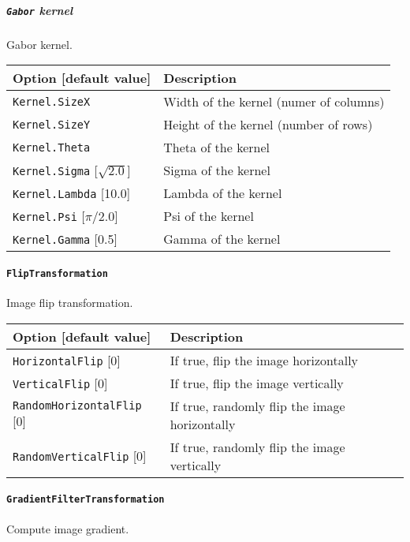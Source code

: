 \documentclass[a4paper,11pt,oneside]{article}
\newcommand{\iponly}{\reversemarginpar
    \marginnote{\color{listletiblue}\normalfont\scriptsize
    {\ttfamily{}\hyperref[sec:N2D2-IP]{\color{listletiblue}N2D2 IP}} \emph{only}}}
\begin{document}
\subparagraph{\texorpdfstring{%
\lstinline[basicstyle=\ttfamily\bfseries]!Gabor! kernel}{Gabor kernel}}
Gabor kernel.

\begin{center}
 \begin{tabular}{| m{4cm} | m{7cm} | }
 \hline
 Option [default value] & Description\\
 \hline\hline
  \cellcolor{requiredcolor}\lstinline!Kernel.SizeX! & Width of the kernel
  (numer of columns)\\
  \cellcolor{requiredcolor}\lstinline!Kernel.SizeY! & Height of the kernel
  (number of rows)\\
  \cellcolor{requiredcolor}\lstinline!Kernel.Theta! & Theta of the kernel\\
  \lstinline!Kernel.Sigma! [$\sqrt{2.0}$] & Sigma of the kernel\\
  \lstinline!Kernel.Lambda! [10.0] & Lambda of the kernel\\
  \lstinline!Kernel.Psi! [$\pi/2.0$] & Psi of the kernel\\
  \lstinline!Kernel.Gamma! [0.5] & Gamma of the kernel\\
 \hline
\end{tabular}
\end{center}


\paragraph{\texorpdfstring{%
\lstinline[basicstyle=\ttfamily\bfseries]!FlipTransformation!}
{FlipTransformation}}
Image flip transformation.

\begin{center}
 \begin{tabular}{| p{5cm} | p{10cm} | }
 \hline
 Option [default value] & Description\\
 \hline\hline
  \lstinline!HorizontalFlip! [0] & If true, flip the image horizontally \\
  \lstinline!VerticalFlip! [0] & If true, flip the image vertically \\
  \lstinline!RandomHorizontalFlip! [0] & If true, randomly flip the image
   horizontally \\
  \lstinline!RandomVerticalFlip! [0] & If true, randomly flip the image
  vertically \\
 \hline
\end{tabular}
\end{center}


\paragraph{\texorpdfstring{%
\lstinline[basicstyle=\ttfamily\bfseries]!GradientFilterTransformation!%
\protect\iponly}{GradientFilterTransformation}}
Compute image gradient.
\end{document}
